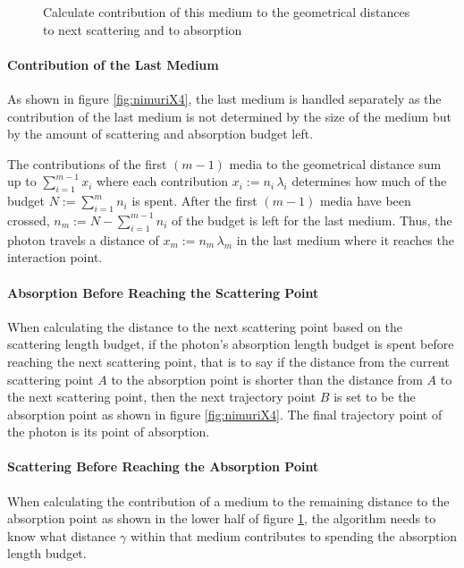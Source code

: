 
\begin{figure}[htbp]
  \caption{Calculate contribution of this medium to the geometrical distances to next scattering and to absorption}
  \label{fig:eewoo3Be}
\end{figure}

\paragraph{Contribution of the Last Medium}
As shown in figure \ref{fig:nimuriX4}, the last medium is handled separately as the contribution of the last medium is not determined by the size of the medium but by the amount of scattering and absorption budget left.

The contributions of the first $(m-1)$ media to the geometrical distance sum up to $\sum_{i=1}^{m-1} x_i$ where each contribution $x_i := n_i\,\lambda_i$ determines how much of the budget $N:=\sum_{i=1}^m n_i$ is spent. After the first $(m-1)$ media have been crossed, $n_m := N - \sum_{i=1}^{m-1} n_i$ of the budget is left for the last medium. Thus, the photon travels a distance of $x_m := n_m\,\lambda_m$ in the last medium where it reaches the interaction point.

\paragraph{Absorption Before Reaching the Scattering Point}
When calculating the distance to the next scattering point based on the scattering length budget, if the photon's absorption length budget is spent before reaching the next scattering point, that is to say if the distance from the current scattering point $A$ to the absorption point is shorter than the distance from $A$ to the next scattering point, then the next trajectory point $B$ is set to be the absorption point as shown in figure \ref{fig:nimuriX4}. The final trajectory point of the photon is its point of absorption.

\paragraph{Scattering Before Reaching the Absorption Point}
When calculating the contribution of a medium to the remaining distance to the absorption point as shown in the lower half of figure \ref{fig:eewoo3Be}, the algorithm needs to know what distance $\gamma$ within that medium contributes to spending the absorption length budget.

